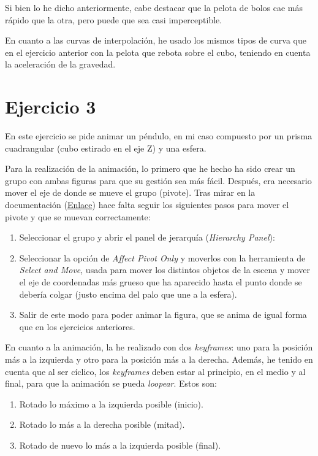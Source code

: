 \documentclass{article}
\begin{document}

Si bien lo he dicho anteriormente, cabe destacar que la pelota de bolos cae más rápido que la otra, pero puede que sea casi imperceptible.

En cuanto a las curvas de interpolación, he usado los mismos tipos de curva que en el ejercicio anterior con la pelota que rebota sobre el cubo, teniendo en cuenta la aceleración de la gravedad. 



\section{Ejercicio 3}

En este ejercicio se pide animar un péndulo, en mi caso compuesto por un prisma cuadrangular (cubo estirado en el eje Z) y una esfera.


Para la realización de la animación, lo primero que he hecho ha sido crear un grupo con ambas figuras para que su gestión sea más fácil. Después, era necesario mover el eje de donde se mueve el grupo (pivote). Tras mirar en la documentación (\href{https://knowledge.autodesk.com/support/3ds-max/learn-explore/caas/CloudHelp/cloudhelp/2021/ENU/3DSMax-Animation/files/GUID-6872F014-4785-43D9-A83B-C774507907B3-htm.html}{Enlace}) hace falta seguir los siguientes pasos para mover el pivote y que se muevan correctamente:

\begin{enumerate}
    \item Seleccionar el grupo y abrir el panel de jerarquía (\textit{Hierarchy Panel}):
    

    \item Seleccionar la opción de \textit{Affect Pivot Only} y moverlos con la herramienta de \textit{Select and Move}, usada para mover los distintos objetos de la escena y mover el eje de coordenadas más grueso que ha aparecido hasta el punto donde se debería colgar (justo encima del palo que une a la esfera).
    

    \item Salir de este modo para poder animar la figura, que se anima de igual forma que en los ejercicios anteriores.
\end{enumerate}

En cuanto a la animación, la he realizado con dos \textit{keyframes}: uno para la posición más a la izquierda y otro para la posición más a la derecha. Además, he tenido en cuenta que al ser cíclico, los \textit{keyframes} deben estar al principio, en el medio y al final, para que la animación se pueda \textit{loopear}. Estos son:

\begin{enumerate}
    \item Rotado lo máximo a la izquierda posible (inicio).
    \item Rotado lo más a la derecha posible (mitad).
    \item Rotado de nuevo lo más a la izquierda posible (final).
\end{enumerate}

\end{document}
